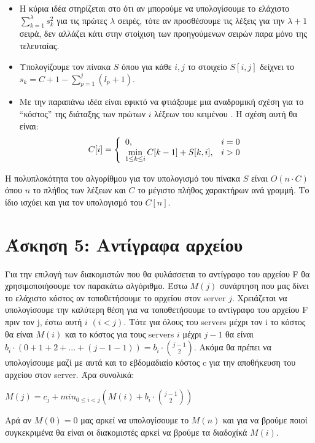 \documentclass[a4paper,12pt]{report}
\begin{document}
\begin{itemize}
 \item Η κύρια ιδέα στηρίζεται στο ότι αν μπορούμε να υπολογίσουμε το ελάχιστο $\sum_{k=1}^{\lambda}{s_k^2}$ για τις πρώτες $\lambda$ σειρές, τότε αν προσθέσουμε τις λέξεις για την $\lambda+1$ σειρά, δεν αλλάζει κάτι στην στοίχιση των προηγούμενων σειρών παρα μόνο της τελευταίας.
 \item Υπολογίζουμε τον πίνακα $S$ όπου για κάθε $i,j$ το στοιχείο $S[i,j]$ δείχνει το $s_k=C+1-\sum_{p=1}^{j}{(l_p+1)}$.
 \item Με την παραπάνω ιδέα είναι εφικτό να φτιάξουμε μια αναδρομική σχέση για το ``κόστος'' της διάταξης των πρώτων $i$ λέξεων του κειμένου . Η σχέση αυτή θα είναι:
  $$
   C[i]=\left\{\begin{array}{l l}
           0, & i=0 \\
	  \displaystyle \min_{1 \leq k \leq i}C[k-1]+S[k,i], & i>0
          \end{array} \right.
  $$ 

\end{itemize}


H πολυπλοκότητα του αλγορίθμου για τον υπολογισμό του πίνακα $S$ είναι $O(n \cdot C)$ όπου $n$ το πλήθος των λέξεων και $C$ το μέγιστο πλήθος χαρακτήρων ανά γραμμή. Το ίδιο ισχύει και για τον υπολογισμό του $C[n]$.

\section*{Άσκηση 5: Αντίγραφα αρχείου}
Για την επιλογή των διακομιστών που θα φυλάσσεται το αντίγραφο του αρχείου F θα χρησιμοποιήσουμε τον παρακάτω αλγόριθμο. Έστω $M(j)$ συνάρτηση που μας δίνει το ελάχιστο κόστος αν τοποθετήσουμε το αρχείου στον server $j$. Χρειάζεται να υπολογίσουμε την καλύτερη θέση για να τοποθετήσουμε το αντίγραφο του αρχείου F πριν τον j, έστω αυτή $i$ $(i<j)$. Tότε για όλους του servers μέχρι τον i το κόστος θα είναι $M(i)$ και το κόστος για τους  servers $i$ μέχρι $j-1$ θα είναι $b_i \cdot (0+1+2+...+(j-1-1)) = b_i \cdot \binom {j-1}{2} $. Ακόμα θα πρέπει να υπολογίσουμε μαζί με αυτά και το εβδομαδιαίο κόστος c για την αποθήκευση του αρχείου στον server. Άρα συνολικά:
\begin{center}
 $M(j)=c_j + min_{0 \leq i<j}(M(i)+b_i \cdot \binom {j-1}{2})$
\end{center}

Αρά αν $M(0)=0$ μας αρκεί να υπολογίσουμε το $M(n)$ και για να βρούμε ποιοί συγκεκριμένα θα είναι οι διακομιστές αρκεί να βρούμε τα διαδοχίκά $M(i)$. 
\end{document}
